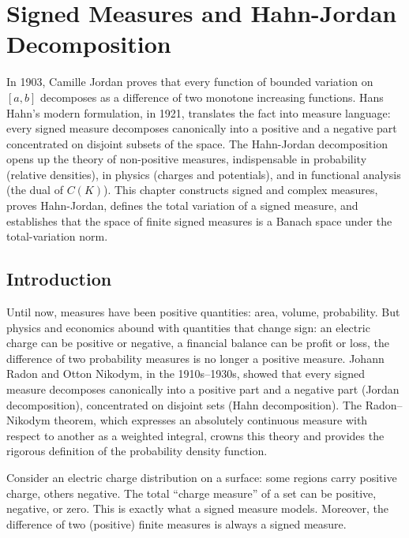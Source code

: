 \chapter{Signed Measures and Hahn-Jordan Decomposition}
\label{ch:signed_measures}

In 1903, Camille Jordan proves that every function of bounded variation on $[a,b]$ decomposes as a difference of two monotone increasing functions. Hans Hahn's modern formulation, in 1921, translates the fact into measure language: every signed measure decomposes canonically into a positive and a negative part concentrated on disjoint subsets of the space. The Hahn-Jordan decomposition opens up the theory of non-positive measures, indispensable in probability (relative densities), in physics (charges and potentials), and in functional analysis (the dual of $C(K)$). This chapter constructs signed and complex measures, proves Hahn-Jordan, defines the total variation of a signed measure, and establishes that the space of finite signed measures is a Banach space under the total-variation norm.

\section{Introduction}

Until now, measures have been positive quantities: area, volume, probability. But physics and economics abound with quantities that change sign: an electric charge can be positive or negative, a financial balance can be profit or loss, the difference of two probability measures is no longer a positive measure. Johann Radon and Otton Nikodym, in the 1910s--1930s, showed that every signed measure decomposes canonically into a positive part and a negative part (Jordan decomposition), concentrated on disjoint sets (Hahn decomposition). The Radon--Nikodym theorem, which expresses an absolutely continuous measure with respect to another as a weighted integral, crowns this theory and provides the rigorous definition of the probability density function.

\begin{intuition}[title=\textbf{Why signed measures?}]
Consider an electric charge distribution on a surface: some regions carry positive
charge, others negative. The total ``charge measure'' of a set can be positive,
negative, or zero. This is exactly what a signed measure models. Moreover, the
difference of two (positive) finite measures is always a signed measure.
\end{intuition}

